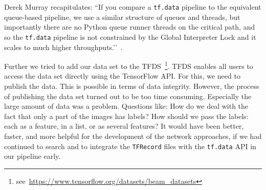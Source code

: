 \bigskip
Derek Murray recapitulates: ``If you compare a \texttt{tf.data} pipeline to the equivalent queue-based pipeline, we use a similar structure of queues and threads, but importantly there are no Python queue runner threads on the critical path, and so the \texttt{tf.data} pipeline is not constrained by the Global Interpreter Lock and it scales to much higher throughputs.’’~\citep{dataAPI}. 

\bigskip
Further we tried to add our data set to the TFDS~\footnote{see~\url{https://www.tensorflow.org/datasets/beam\_datasets}}. TFDS enables all users to access the data set directly using the TensorFlow API. For this, we need to publish the data. This is possible in terms of data integrity. However, the process of publishing the data set turned out to be too time consuming. Especially the large amount of data was a problem. Questions like: How do we deal with the fact that only a part of the images has labels? How should we pass the labels: each as a feature, in a list, or as several features? It would have been better, faster, and more helpful for the development of the network approaches, if we had continued to search and to integrate the \texttt{TFRecord} files with the \texttt{tf.data} API in our pipeline early. 
